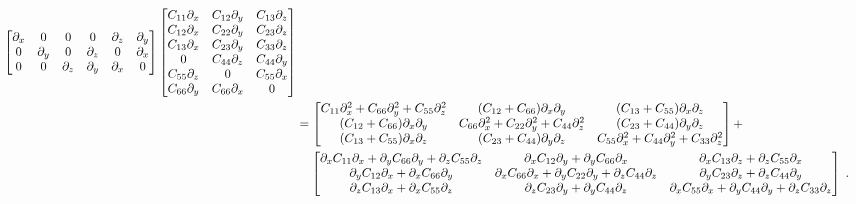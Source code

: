 \begin{align}
\begin{bmatrix}
        \partial_x & 0 & 0 & 0 & \partial_z & \partial_y \\
        0 & \partial_y & 0 & \partial_z & 0 & \partial_x \\
        0 & 0 & \partial_z & \partial_y & \partial_x & 0
    \end{bmatrix}
    \begin{bmatrix}
        C_{11}\partial_x & C_{12}\partial_y & C_{13}\partial_z \\
        C_{12}\partial_x & C_{22}\partial_y & C_{23}\partial_z \\
        C_{13}\partial_x & C_{23}\partial_y & C_{33}\partial_z \\
        0                & C_{44}\partial_z & C_{44}\partial_y \\
        C_{55}\partial_z & 0                & C_{55}\partial_x \\
        C_{66}\partial_y & C_{66}\partial_x & 0      
    \end{bmatrix} \\ \nonumber
    &=
    \begin{bmatrix}
        C_{11}\partial_x^2+C_{66}\partial_y^2+C_{55}\partial_z^2 & (C_{12}+C_{66})\partial_x\partial_y & (C_{13}+C_{55})\partial_x\partial_z \\
        (C_{12}+C_{66})\partial_x\partial_y & C_{66}\partial_x^2+C_{22}\partial_y^2+C_{44}\partial_z^2 & (C_{23}+C_{44})\partial_y\partial_z  \\
        (C_{13}+C_{55})\partial_x\partial_z & (C_{23}+C_{44})\partial_y\partial_z & C_{55}\partial_x^2+C_{44}\partial_y^2+C_{33}\partial_z^2
    \end{bmatrix} + \\ \nonumber
    &\ \hphantom{=}
    \begin{bmatrix}
        \partial_xC_{11}\partial_x+\partial_yC_{66}\partial_y+\partial_zC_{55}\partial_z & \partial_xC_{12}\partial_y+\partial_yC_{66}\partial_x & \partial_xC_{13}\partial_z+\partial_zC_{55}\partial_x \\
        \partial_yC_{12}\partial_x+\partial_xC_{66}\partial_y & \partial_xC_{66}\partial_x+\partial_yC_{22}\partial_y+\partial_zC_{44}\partial_z & \partial_yC_{23}\partial_z+\partial_zC_{44}\partial_y \\
        \partial_zC_{13}\partial_x+\partial_xC_{55}\partial_z & \partial_zC_{23}\partial_y+\partial_yC_{44}\partial_z & \partial_xC_{55}\partial_x+\partial_yC_{44}\partial_y+\partial_zC_{33}\partial_z
    \end{bmatrix}
    \;.
\end{align}

